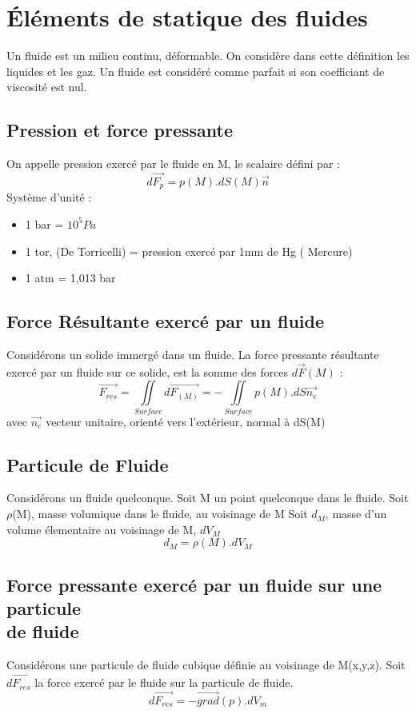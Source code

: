\chapter{Éléments de statique des fluides}
\begin{de}
Un fluide est un milieu continu, déformable. On considère dans cette définition les liquides et les gaz. Un fluide est considéré comme parfait si son coefficiant de viscosité est nul.
\end{de}
\section{Pression et force pressante}
On appelle pression exercé par le fluide en M, le scalaire défini par :
$$d\overrightarrow{F_{p}} = p(M).dS(M)\overrightarrow{n}$$
Système d'unité :
\begin{itemize}
 \item 1 bar = $10^{5} Pa$
 \item 1 tor, (De Torricelli) = pression exercé par 1mm de Hg ( Mercure)
 \item 1 atm = 1,013 bar
\end{itemize}
\section{Force Résultante exercé par un fluide}
Considérons un solide immergé dans un fluide.
La force pressante résultante exercé par un fluide sur ce solide, est la somme des forces $d\overrightarrow{F}(M)$ :
$$\overrightarrow{F_{res}} = \underset{Surface}\iint d\overrightarrow{F_{(M)}} = - \underset{Surface}\iint p(M).dS\overrightarrow{n_{e}}$$
avec $\overrightarrow{n_e}$ vecteur unitaire, orienté vers l'extérieur, normal à dS(M)
\section{Particule de Fluide}
Considérons un fluide quelconque. Soit M un point quelconque dans le fluide.
Soit $\rho$(M), masse volumique dans le fluide, au voisinage de M
Soit $d_M$, masse d'un volume élementaire au voisinage de M, $dV_M$
$$d_M = \rho(M).dV_M$$
\section{Force pressante exercé par un fluide sur une particule\\ de fluide}
Considérons une particule de fluide cubique définie au voisinage de M(x,y,z).
Soit $d\overrightarrow{F_{res}}$ la force exercé par le fluide sur la particule de fluide.
$$d\overrightarrow{F_{res}} = -\overrightarrow{grad}(p).dV_m$$
